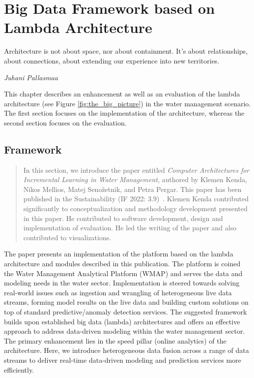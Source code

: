% 
\chapter{Big Data Framework based on Lambda Architecture}
\label{ch:big_data_framework}

\epigraph{Architecture is not about space, nor about containment. It's about relationships, about connections, about extending our experience into new territories.}{\textit{Juhani Pallasmaa}}

This chapter describes an enhancement as well as an evaluation of the lambda architecture (see Figure \ref{fig:the_big_picture}) in the water management scenario.
The first section focuses on the implementation of the architecture, whereas the second section focuses on the evaluation.

\section{Framework}

\begin{quote}
In this section, we introduce the paper entitled \textit{Computer Architectures for Incremental Learning in Water Management}, authored by Klemen Kenda, Nikos Mellios, Matej Senožetnik, and Petra Pergar. 
This paper has been published in the Sustainability (IF 2022: 3.9)~\cite{kenda:2022:water-framework}.
Klemen Kenda contributed significantly to conceptualization and methodology development presented in this paper. 
He contributed to software development, design and implementation of evaluation.
He led the writing of the paper and also contributed to visualizations.
\end{quote}

The paper presents an implementation of the platform based on the lambda architecture and modules described in this publication.
The platform is coined the Water Management Analytical Platform (WMAP) and serves the data and modeling needs in the water sector.
Implementation is steered towards solving real-world issues such as ingestion and wrangling of heterogeneous live data streams, forming model results on the live data and building custom solutions on top of standard predictive/anomaly detection services.
The suggested framework builds upon established big data (lambda) architectures and offers an effective approach to address data-driven modeling within the water management sector. 
The primary enhancement lies in the speed pillar (online analytics) of the architecture. 
Here, we introduce heterogeneous data fusion across a range of data streams to deliver real-time data-driven modeling and prediction services more efficiently.

